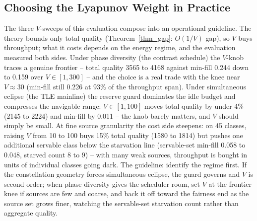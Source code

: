 
\subsection{Choosing the Lyapunov Weight in Practice}\label{EV_VGUIDE}
The three $V$-sweeps of this evaluation compose into an operational
guideline. The theory bounds only total quality (Theorem~\ref{thm_gap}:
$O(1/V)$ gap), so $V$ buys throughput; what it costs depends on the energy
regime, and the evaluation measured both sides. Under phase diversity (the
contrast schedule) the $V$-knob traces a genuine frontier -- total quality
3565 to 4168 against min-fill 0.244 down to 0.159 over $V \in [1, 300]$ --
and the choice is a real trade with the knee near $V \approx 30$ (min-fill
still 0.226 at 93\% of the throughput span). Under simultaneous eclipse (the
TLE mainline) the reserve guard dominates the idle budget and compresses the
navigable range: $V \in [1, 100]$ moves total quality by under 4\% (2145 to
2224) and min-fill by 0.011 -- the knob barely matters, and $V$ should
simply be small. At fine source granularity the cost side steepens: on 45
classes, raising $V$ from 10 to 100 buys 15\% total quality (1580 to 1814)
but pushes one additional servable class below the starvation line
(servable-set min-fill 0.058 to 0.048, starved count 8 to 9) -- with many
weak sources, throughput is bought in units of individual classes going
dark. The guideline: identify the regime first. If the constellation
geometry forces simultaneous eclipse, the guard governs and $V$ is
second-order; when phase diversity gives the scheduler room, set $V$ at the
frontier knee if sources are few and coarse, and back it off toward the
fairness end as the source set grows finer, watching the servable-set
starvation count rather than aggregate quality.
